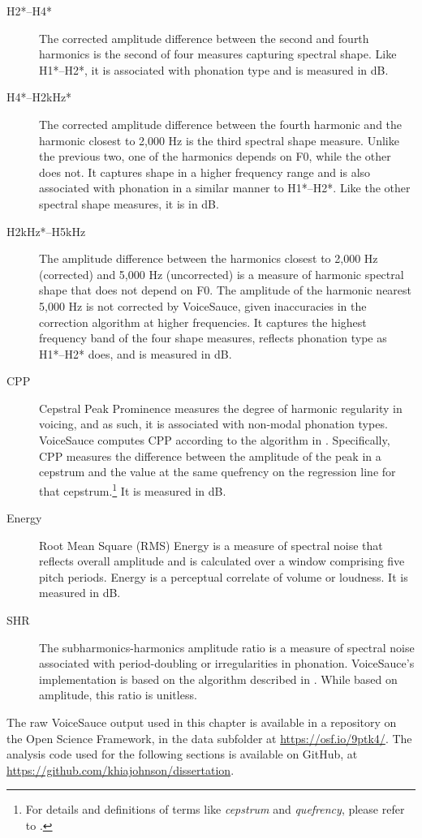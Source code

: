\begin{description}
    \item[H2*--H4*] The corrected amplitude difference between the second and fourth harmonics is the second of four measures capturing spectral shape. Like H1*--H2*, it is associated with phonation type and is measured in dB.
    \item[H4*--H2kHz*] The corrected amplitude difference between the fourth harmonic and the harmonic closest to 2,000 Hz is the third spectral shape measure. Unlike the previous two, one of the harmonics depends on F0, while the other does not. It captures shape in a higher frequency range and is also associated with phonation in a similar manner to H1*--H2*. Like the other spectral shape measures, it is in dB.
    \item[H2kHz*--H5kHz] The amplitude difference between the harmonics closest to 2,000 Hz (corrected) and 5,000 Hz (uncorrected) is a measure of harmonic spectral shape that does not depend on F0. The amplitude of the harmonic nearest 5,000 Hz is not corrected by VoiceSauce, given inaccuracies in the correction algorithm at higher frequencies. It captures the highest frequency band of the four shape measures, reflects phonation type as H1*--H2* does, and is measured in dB.
    \item[CPP] Cepstral Peak Prominence measures the degree of harmonic regularity in voicing, and as such, it is associated with non-modal phonation types. VoiceSauce computes CPP according to the algorithm in \citet{hillenbrand_1994_acoustic}. Specifically, CPP measures the difference between the amplitude of the peak in a cepstrum and the value at the same quefrency on the regression line for that cepstrum.\footnote{For details and definitions of terms like \textit{cepstrum} and \textit{quefrency}, please refer to \citet{hillenbrand_1994_acoustic}.} It is measured in dB.
    \item[Energy] Root Mean Square (RMS) Energy is a measure of spectral noise that reflects overall amplitude and is calculated over a window comprising five pitch periods. Energy is a perceptual correlate of volume or loudness. It is measured in dB.
    \item[SHR] The subharmonics-harmonics amplitude ratio is a measure of spectral noise associated with period-doubling or irregularities in phonation. VoiceSauce's implementation is based on the algorithm described in \cite{sun_2002_shr}. While based on amplitude, this ratio is unitless. 
\end{description}

The raw VoiceSauce output used in this chapter is available in a repository on the Open Science Framework, in the data subfolder at \url{https://osf.io/9ptk4/}. The analysis code used for the following sections is available on GitHub, at \url{https://github.com/khiajohnson/dissertation}.

